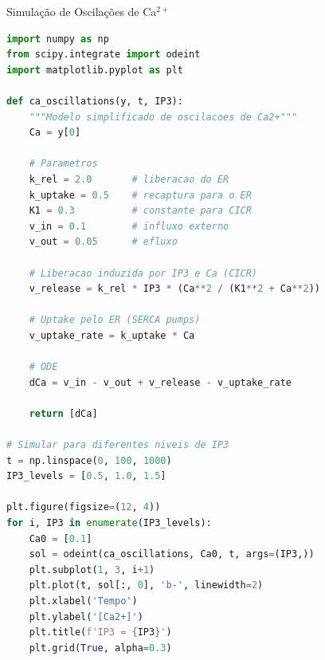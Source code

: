 \begin{frame}[fragile]{Simulação de Oscilações de Ca$^{2+}$}
\begin{lstlisting}[language=Python, caption=Modelo de oscilações de cálcio, basicstyle=\ttfamily\scriptsize]
import numpy as np
from scipy.integrate import odeint
import matplotlib.pyplot as plt

def ca_oscillations(y, t, IP3):
    """Modelo simplificado de oscilacoes de Ca2+"""
    Ca = y[0]

    # Parametros
    k_rel = 2.0       # liberacao do ER
    k_uptake = 0.5    # recaptura para o ER
    K1 = 0.3          # constante para CICR
    v_in = 0.1        # influxo externo
    v_out = 0.05      # efluxo

    # Liberacao induzida por IP3 e Ca (CICR)
    v_release = k_rel * IP3 * (Ca**2 / (K1**2 + Ca**2))

    # Uptake pelo ER (SERCA pumps)
    v_uptake_rate = k_uptake * Ca

    # ODE
    dCa = v_in - v_out + v_release - v_uptake_rate

    return [dCa]

# Simular para diferentes niveis de IP3
t = np.linspace(0, 100, 1000)
IP3_levels = [0.5, 1.0, 1.5]

plt.figure(figsize=(12, 4))
for i, IP3 in enumerate(IP3_levels):
    Ca0 = [0.1]
    sol = odeint(ca_oscillations, Ca0, t, args=(IP3,))
    plt.subplot(1, 3, i+1)
    plt.plot(t, sol[:, 0], 'b-', linewidth=2)
    plt.xlabel('Tempo')
    plt.ylabel('[Ca2+]')
    plt.title(f'IP3 = {IP3}')
    plt.grid(True, alpha=0.3)
\end{lstlisting}
\end{frame}

